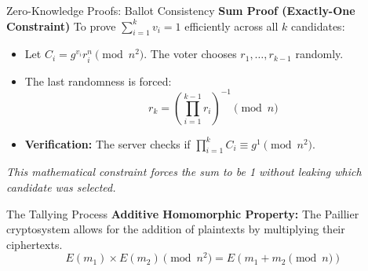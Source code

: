 \documentclass{beamer}
\begin{document}
\begin{frame}{Zero-Knowledge Proofs: Ballot Consistency}
    \textbf{Sum Proof (Exactly-One Constraint)}
    To prove $\sum_{i=1}^k v_i = 1$ efficiently across all $k$ candidates:
    \begin{itemize}
        \item Let $C_i = g^{v_i} r_i^n \pmod{n^2}$. The voter chooses $r_1, \dots, r_{k-1}$ randomly.
        \item The last randomness is forced: 
        \begin{equation*} r_k = \left( \prod_{i=1}^{k-1} r_i \right)^{-1} \pmod n \end{equation*}
        \item \textbf{Verification:} The server checks if $\prod_{i=1}^k C_i \equiv g^1 \pmod{n^2}$.
    \end{itemize}
    \centering \textit{This mathematical constraint forces the sum to be 1 without leaking which candidate was selected.}
\end{frame}

\begin{frame}[fragile]{The Tallying Process}
    \textbf{Additive Homomorphic Property:}
    The Paillier cryptosystem allows for the addition of plaintexts by multiplying their ciphertexts.
    \begin{equation*}
        E(m_1) \times E(m_2) \pmod{n^2} = E(m_1 + m_2 \pmod n)
    \end{equation*}
    \vspace{0.5cm}
\end{frame}
\end{document}
